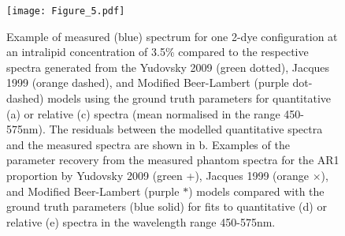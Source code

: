 \begin{figure}[htbp]
    \centering {}
    \texttt{[image: Figure\_5.pdf]}
    \caption{Example of measured (\textcolor{MyBlue}{blue}) spectrum for one 2-dye configuration at an intralipid concentration of 3.5\% compared to the respective spectra generated from the Yudovsky 2009 (\textcolor{MyGreen}{green dotted}), Jacques 1999 (\textcolor{MyOrange}{orange dashed}), and Modified Beer-Lambert (\textcolor{MyPurple}{purple dot-dashed}) models using the ground truth parameters for quantitative (a) or relative (c) spectra (mean normalised in the range 450-575nm). The residuals between the modelled quantitative spectra and the measured spectra are shown in b. Examples of the parameter recovery from the measured phantom spectra for the AR1 proportion by Yudovsky 2009 (\textcolor{MyGreen}{green +}), Jacques 1999 (\textcolor{MyOrange}{orange $\times$)}, and Modified Beer-Lambert (\textcolor{MyPurple}{purple $*$}) models compared with the ground truth parameters (\textcolor{MyBlue}{blue solid}) for fits to quantitative (d) or relative (e) spectra in the wavelength range 450-575nm.}
 \label{fig:phantomforwards}
\end{figure}

